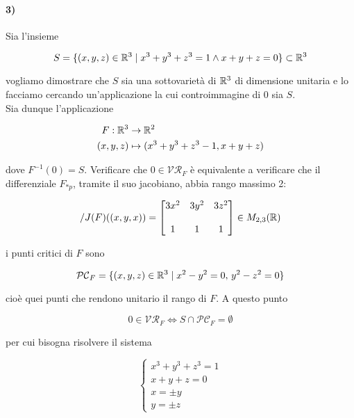 \paragraph{3)}

Sia l'insieme

\begin{equation}
	S = \{ (x,y,z) \in \mathbb{R}^{3} \mid x^{3} + y^{3} + z^{3} = 1 \wedge x+y+z=0 \} \subset \mathbb{R}^{3}
\end{equation}

vogliamo dimostrare che $ S $ sia una sottovarietà di $ \mathbb{R}^{3} $ di dimensione unitaria e lo facciamo cercando un'applicazione la cui controimmagine di 0 sia $ S $.\\
Sia dunque l'applicazione

\begin{align}
	\begin{split}
		F : \mathbb{R}^{3} &\to \mathbb{R}^{2}\\
		(x,y,z) &\mapsto (x^{3}+y^{3}+z^{3}-1, x+y+z)
	\end{split}
\end{align}

dove $ F^{-1}(0) = S $. Verificare che $ 0 \in \mathcal{VR}_{F} $ è equivalente a verificare che il differenziale $ F_{*p} $, tramite il suo jacobiano, abbia rango massimo 2:

\begin{equation}/
	J(F)((x,y,x)) = \begin{bmatrix} 3x^{2} & 3y^{2} & 3z^{2} \\\\ 1 & 1 & 1 \end{bmatrix} \in M_{2,3}(\mathbb{R})
\end{equation}

i punti critici di $ F $ sono

\begin{equation}
	\mathcal{PC}_{F} = \{ (x,y,z) \in \mathbb{R}^{3} \mid x^{2}-y^{2}=0 , \, y^{2}-z^{2}=0 \}
\end{equation}

cioè quei punti che rendono unitario il rango di $ F $. A questo punto

\begin{equation}
	0 \in \mathcal{VR}_{F} \iff S \cap \mathcal{PC}_{F} = \emptyset
\end{equation}

per cui bisogna risolvere il sistema

\begin{equation}
	\begin{cases}
		x^{3} + y^{3} + z^{3} = 1\\
		x+y+z=0\\
		x = \pm y\\
		y = \pm z
	\end{cases}
\end{equation}

